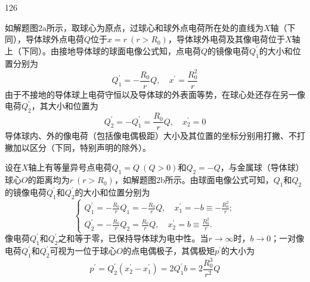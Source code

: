 \begin{solution}{126}
    \begin{subsolution}
        如解题图2a所示，取球心为原点，过球心和球外点电荷所在处的直线为$X$轴（下同），导体球外点电荷$Q$位于$x = r \ ( r > R _ { 0 } )$，导体球外电荷及其像电荷位于$X$轴上（下同）。由接地导体球的球面电像公式知，点电荷$Q$的镜像电荷$Q _ { 1 } ^ { \prime }$的大小和位置分别为
        \begin{equation}
            Q _ {1} ^ {\prime} = - \frac {R _ {0}}{r} Q, \quad x ^ {\prime} = \frac {R _ {0} ^ {2}}{r}
            \label{eq:1.s126}
        \end{equation}
        由于不接地的导体球上电荷守恒以及导体球的外表面等势，在球心处还存在另一像电荷$Q _ { 2 } ^ { \prime }$，其大小和位置为
        \begin{equation}
            Q _ {2} ^ {\prime} = - Q _ {1} ^ {\prime} = \frac {R _ {0}}{r} Q, \quad x _ {2} ^ {\prime} = 0
            \label{eq:2.s126}
        \end{equation}
        导体球内、外的像电荷（包括像电偶极距）大小及其位置的坐标分别用打撇、不打撇加以区分（下同，特别声明的除外）。
    \end{subsolution}
    \begin{subsolution}
        设在$X$轴上有等量异号点电荷$Q _ { 1 } = Q \ ( Q > 0 )$和$Q _ { 2 } = - Q$，与金属球（导体球）球心$O$的距离均为$r \ ( r > R _ { 0 } )$，如解题图2b所示。由球面电像公式可知，$Q _ { 1 }$和$Q _ { 2 }$的镜像电荷$Q _ { 1 } ^ { \prime }$和$Q _ { 2 } ^ { \prime }$的大小和位置分别为
        \begin{equation}
            \left\{ \begin{array}{l} Q _ {1} ^ {\prime} = - \frac {R _ {0}}{r} Q _ {1} = - \frac {R _ {0}}{r} Q, \quad x _ {1} ^ {\prime} = - b \equiv - \frac {R _ {0} ^ {2}}{r}; \\ Q _ {2} ^ {\prime} = - \frac {R _ {0}}{r} Q _ {2} = \frac {R _ {0}}{r} Q, \quad x _ {2} ^ {\prime} = b \equiv \frac {R _ {0} ^ {2}}{r}. \end{array} \right.
            \label{eq:3.s126}
        \end{equation}
        像电荷$Q _ { 1 } ^ { \prime }$和$Q _ { 2 } ^ { \prime }$之和等于零，已保持导体球为电中性。当$r \to \infty$时，$b \to 0$；一对像电荷$Q _ { 1 } ^ { \prime }$和$Q _ { 2 } ^ { \prime }$可视为一位于球心$O$的点电偶极子，其偶极矩$p ^ { \prime }$的大小为
        \begin{equation}
            p ^ {\prime} = Q _ {2} ^ {\prime} \left(x _ {2} ^ {\prime} - x _ {1} ^ {\prime}\right) = 2 Q _ {1} ^ {\prime} b = 2 \frac {R _ {0} ^ {3}}{r ^ {2}} Q

\end{equation}
\end{subsolution}
\end{solution}
